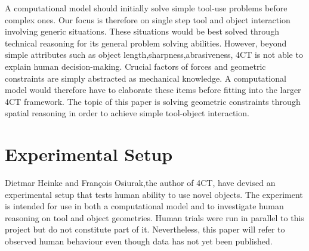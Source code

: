 \documentclass[11]{article}
\begin{document}
A computational model should initially solve simple tool-use problems before complex ones.
Our focus is therefore on single step tool and object interaction involving generic situations.
These situations would be best solved through technical reasoning for its general problem solving abilities. 
However, beyond simple attributes such as object length,sharpness,abrasiveness, 4CT is not able to explain human decision-making.
Crucial factors of forces and geometric constraints are simply abstracted as mechanical knowledge. 
A computational model would therefore have to elaborate these items before fitting into the larger 4CT framework. 
The topic of this paper is solving geometric constraints through spatial reasoning in order to achieve simple tool-object interaction.  

\section{Experimental Setup}

Dietmar Heinke and Fran\c{c}ois Osiurak,the author of 4CT, have devised an experimental setup that tests human ability to use novel objects. 
The experiment is intended for use in both a computational model and to investigate human reasoning on tool and object geometries. 
Human trials were run in parallel to this project but do not constitute part of it. 
Nevertheless, this paper will refer to observed human behaviour even though data has not yet been published. 
\end{document}
